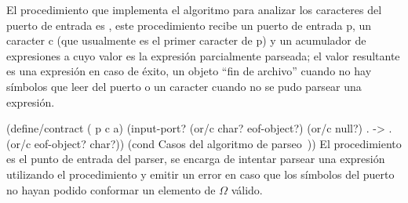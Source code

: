 \documentclass[letterpaper, twoside, openright, 11pt]{book}%
\begin{document}
El procedimiento que implementa el algoritmo para analizar los caracteres del puerto de entrada es {\Tt{}\nwendquote}, este procedimiento recibe un puerto de entrada {\Tt{}p\nwendquote}, un caracter {\Tt{}c\nwendquote} (que usualmente es el primer caracter de {\Tt{}p\nwendquote}) y un acumulador de expresiones {\Tt{}a\nwendquote} cuyo valor es la expresión parcialmente parseada; el valor resultante es una expresión en caso de éxito, un objeto ``fin de archivo'' cuando no hay símbolos que leer del puerto o un caracter cuando no se pudo parsear una expresión.

\nwenddocs{}\endmoddef\nwstartdeflinemarkup{}\nwenddeflinemarkup
(define/contract ( p c a)
  (input-port? (or/c char? eof-object?) (or/c  null?)
               . -> . (or/c  eof-object? char?))
  (cond \LA{}Casos del algoritmo de parseo~{\nwtagstyle{}}\RA{}))
\eatline
{}\nwendcode{}\nwdocspar
El procedimiento {\Tt{}\nwendquote} es el punto de entrada del parser, se encarga de intentar parsear una expresión utilizando el procedimiento {\Tt{}\nwendquote} y emitir un error en caso que los símbolos del puerto no hayan podido conformar un elemento de \( Ω \) válido.
\end{document}
